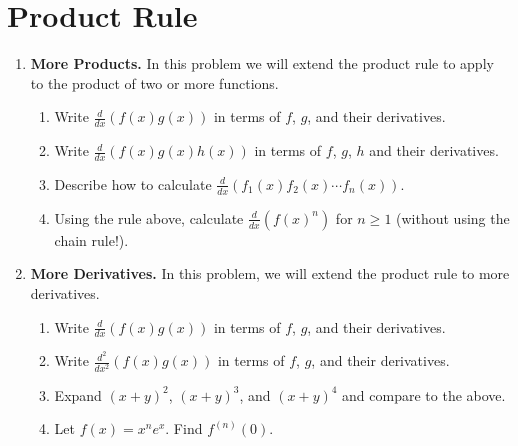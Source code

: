 \documentclass{article}
\begin{document}
\section{Product Rule}
\begin{enumerate}

\item \textbf{More Products.} In this problem we will extend the product rule to apply to the product of two or more functions.

\begin{enumerate}

\item Write $\frac{d}{dx}(f(x)g(x))$ in terms of $f$, $g$, and their derivatives.


\vskip 4cm

\item Write $\frac{d}{dx}(f(x)g(x)h(x))$ in terms of $f$, $g$, $h$ and their derivatives.

\vskip 4cm
\item Describe how to calculate $\frac{d}{dx} (f_1(x) f_2(x) \cdots f_n(x))$.

\vskip 7cm

\item Using the rule above, calculate $\frac{d}{dx} (f(x)^n)$ for $n \geq 1$ (without using the chain rule!).


\vskip 4cm

\end{enumerate}

\item \textbf{More Derivatives.} In this problem, we will extend the product rule to more derivatives.

\begin{enumerate}

\item Write $\frac{d}{dx} (f(x)g(x))$ in terms of $f$, $g$, and their derivatives.


\vskip 4cm
\item Write $\frac{d^2}{dx^2} (f(x)g(x))$ in terms of $f$, $g$, and their derivatives.


\vskip 4cm




\item Expand $(x+y)^2$, $(x+y)^3$, and $(x+y)^4$ and compare to the above.


\vskip 4cm
\item Let $f(x) = x^n e^x$. Find $f^{(n)}(0)$.


\vskip 4cm

\end{enumerate}


\end{enumerate}
\end{document}
